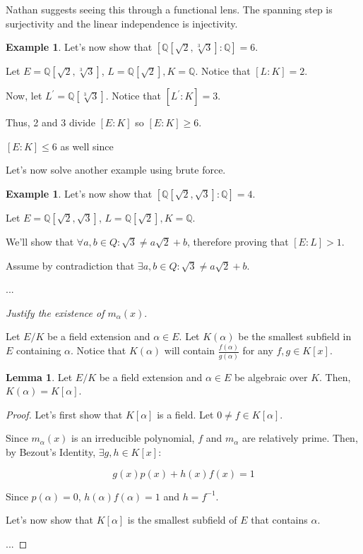 \documentclass{article}
\theoremstyle{definition}
\newtheorem{lemma}[theorem]{Lemma}
\newtheorem{example}[theorem]{Example}
\newcommand{\Q}{\mathbb{Q}}
\begin{document}
Nathan suggests seeing this through a functional lens. The spanning step is surjectivity and the linear independence
is injectivity.

\begin{example}
    Let's now show that $[\Q[\sqrt{2}, \sqrt[3]{3}]:\Q] = 6$.

    Let $E = \Q[\sqrt{2}, \sqrt[3]{3}]$, $L = \Q[\sqrt{2}], K = \Q$.
    Notice that $[L : K] = 2$.
    
    Now, let $L^{\prime} = \Q[\sqrt[3]{3}]$. Notice that $[L^{\prime} : K] = 3$.

    Thus, 2 and 3 divide $[E:K]$ so $[E : K] \geq 6$.

    $[E : K] \leq 6$ as well since
\end{example}

Let's now solve another example using brute force.

\begin{example}
    Let's now show that $[\Q[\sqrt{2}, \sqrt{3}]:\Q] = 4$.

    Let $E = \Q[\sqrt{2}, \sqrt{3}]$, $L = \Q[\sqrt{2}], K = \Q$.

    We'll show that $\forall a,b \in Q: \sqrt{3} \neq a\sqrt{2} + b$, therefore proving
    that $[E: L] > 1$.

    Assume by contradiction that $\exists a,b \in Q: \sqrt{3} \neq a\sqrt{2} + b$.

    ...
\end{example}

\textit{Justify the existence of $m_{\alpha}(x)$}.

Let $E/K$ be a field extension and $\alpha \in E$. Let $K(\alpha)$ be the smallest
subfield in $E$ containing $\alpha$. Notice that $K(\alpha)$ will contain $\frac{f(\alpha)}{g(\alpha)}$
for any $f,g \in K[x]$.

\begin{lemma}
    Let $E/K$ be a field extension and $\alpha \in E$ be algebraic over $K$.
    Then, $K(\alpha) = K[\alpha]$.
\end{lemma}
\begin{proof}
    Let's first show that $K[\alpha]$ is a field. Let $0 \neq f \in K[\alpha]$.

    Since $m_{\alpha}(x)$ is an irreducible polynomial, $f$ and $m_{\alpha}$ are
    relatively prime. Then, by Bezout's Identity, $\exists g,h \in K[x]:$

    \[ g(x)p(x) + h(x)f(x) = 1\] 

    Since $p(\alpha) = 0$, $h(\alpha)f(\alpha) = 1$ and $h = f^{-1}$.

    Let's now show that $K[\alpha]$ is the smallest subfield of $E$ that contains $\alpha$.

    ...
\end{proof}
\end{document}
